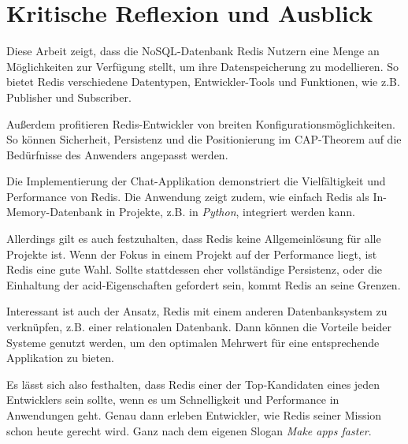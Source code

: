 
\chapter{Kritische Reflexion und Ausblick}

Diese Arbeit zeigt, dass die \ac{NoSQL}-Datenbank \ac{Redis} Nutzern eine Menge an Möglichkeiten zur Verfügung stellt, um ihre Datenspeicherung zu modellieren. So bietet \ac{Redis} verschiedene Datentypen, Entwickler-Tools und Funktionen, wie z.B. Publisher und Subscriber. 

Außerdem profitieren \ac{Redis}-Entwickler von breiten Konfigurationsmöglichkeiten. So können Sicherheit, Persistenz und die Positionierung im \ac{CAP}-Theorem auf die Bedürfnisse des Anwenders angepasst werden.

Die Implementierung der Chat-Applikation demonstriert die Vielfältigkeit und Performance von \ac{Redis}. Die Anwendung zeigt zudem, wie einfach \ac{Redis} als In-Memory-Datenbank in Projekte, z.B. in \textit{Python}, integriert werden kann.

Allerdings gilt es auch festzuhalten, dass \ac{Redis} keine Allgemeinlösung für alle Projekte ist. Wenn der Fokus in einem Projekt auf der Performance liegt, ist \ac{Redis} eine gute Wahl. Sollte stattdessen eher vollständige Persistenz, oder die Einhaltung der \gls{acid}-Eigenschaften gefordert sein, kommt \ac{Redis} an seine Grenzen. 

Interessant ist auch der Ansatz, \ac{Redis} mit einem anderen Datenbanksystem zu verknüpfen, z.B. einer relationalen Datenbank. Dann können die Vorteile beider Systeme genutzt werden, um den optimalen Mehrwert für eine entsprechende Applikation zu bieten. 

Es lässt sich also festhalten, dass \ac{Redis} einer der Top-Kandidaten eines jeden Entwicklers sein sollte, wenn es um Schnelligkeit und Performance in Anwendungen geht. Genau dann erleben Entwickler, wie \ac{Redis} seiner Mission schon heute gerecht wird. Ganz nach dem eigenen Slogan \glqq \textit{Make apps faster}\grqq .